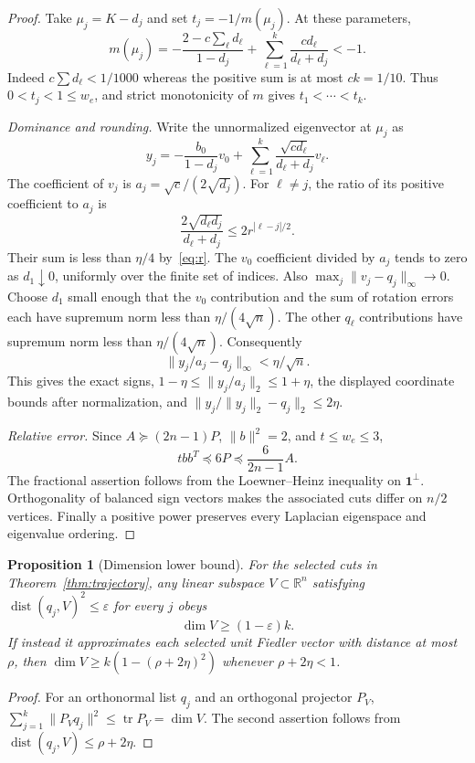 \documentclass[11pt]{article}
\newtheorem{proposition}[theorem]{Proposition}
\newcommand{\one}{\boldsymbol 1}
\newcommand{\R}{\mathbb R}
\newcommand{\eps}{\varepsilon}
\begin{document}
\begin{proof}
Take $\mu_j=K-d_j$ and set $t_j=-1/m(\mu_j)$. At these parameters,
\[
 m(\mu_j)=-\frac{2-c\sum_\ell d_\ell}{1-d_j}
             +\sum_{\ell=1}^k\frac{cd_\ell}{d_\ell+d_j}<-1.
\]
Indeed $c\sum d_\ell<1/1000$ whereas the positive sum is at most
$ck=1/10$. Thus $0<t_j<1\le w_e$, and strict monotonicity of $m$
gives $t_1<\cdots<t_k$.

\textit{Dominance and rounding.}
Write the unnormalized eigenvector at $\mu_j$ as
\[
 y_j=-\frac{b_0}{1-d_j}v_0+
                  \sum_{\ell=1}^k\frac{\sqrt{cd_\ell}}{d_\ell+d_j}v_\ell.
\]
The coefficient of $v_j$ is $a_j=\sqrt c/(2\sqrt{d_j})$. For
$\ell\ne j$, the ratio of its positive coefficient to $a_j$ is
\[
 \frac{2\sqrt{d_\ell d_j}}{d_\ell+d_j}
             \le2r^{|\ell-j|/2}.
\]
Their sum is less than $\eta/4$ by~\eqref{eq:r}. The $v_0$
coefficient divided by $a_j$ tends to zero as $d_1\downarrow0$,
uniformly over the finite set of indices. Also
$\max_j\|v_j-q_j\|_\infty\to0$. Choose $d_1$ small enough that
the $v_0$ contribution and the sum of rotation errors each have
supremum norm less than $\eta/(4\sqrt n)$. The other $q_\ell$
contributions have supremum norm less than $\eta/(4\sqrt n)$.
Consequently
\[
                   \|y_j/a_j-q_j\|_\infty<\eta/\sqrt n.
\]
This gives the exact signs, $1-\eta\le\|y_j/a_j\|_2\le1+\eta$,
the displayed coordinate bounds after normalization, and
$\|y_j/\|y_j\|_2-q_j\|_2\le2\eta$.

\textit{Relative error.}
Since $A\succeq(2n-1)P$, $\|b\|^2=2$, and $t\le w_e\le3$,
\[
 tbb^T\preceq6P\preceq\frac6{2n-1}A.
\]
The fractional assertion follows from the Loewner--Heinz inequality
on $\one^\perp$. Orthogonality of balanced sign vectors makes the
associated cuts differ on $n/2$ vertices. Finally a positive power
preserves every Laplacian eigenspace and eigenvalue ordering.
\end{proof}

\begin{proposition}[Dimension lower bound]\label{prop:dimension}
For the selected cuts in Theorem~\ref{thm:trajectory}, any linear
subspace $V\subset\R^n$ satisfying
$\operatorname{dist}(q_j,V)^2\le\eps$ for every $j$ obeys
\[
                         \dim V\ge(1-\eps)k.
\]
If instead it approximates each selected unit Fiedler vector with
distance at most $\rho$, then
$\dim V\ge k(1-(\rho+2\eta)^2)$ whenever $\rho+2\eta<1$.
\end{proposition}
\begin{proof}
For an orthonormal list $q_j$ and an orthogonal projector $P_V$,
$\sum_{j=1}^k\|P_Vq_j\|^2\le\operatorname{tr}P_V=\dim V$.
The second assertion follows from
$\operatorname{dist}(q_j,V)\le\rho+2\eta$.
\end{proof}
\end{document}
